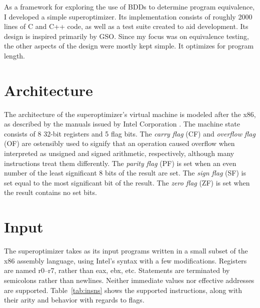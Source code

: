 \documentclass[a4paper,11pt]{kth-mag}
\begin{document}
As a framework for exploring the use of BDDs to determine program equivalence, I developed a simple superoptimizer.
Its implementation consists of roughly 2000 lines of C and C++ code, as well as a test suite created to aid development.
Its design is inspired primarily by GSO.
Since my focus was on equivalence testing, the other aspects of the design were mostly kept simple.
It optimizes for program length.

\section{Architecture}

The architecture of the superoptimizer's virtual machine is modeled after the x86, as described by the manuals issued by Intel Corporation \cite{intel_1,intel_2a,intel_2b}. %
The machine state consists of 8 32-bit registers and 5 flag bits.
The \emph{carry flag} (CF) and \emph{overflow flag} (OF) are ostensibly used to signify that an operation caused overflow when interpreted as unsigned and signed arithmetic, respectively, although many instructions treat them differently.
The \emph{parity flag} (PF) is set when an even number of the least significant 8 bits of the result are set.
The \emph{sign flag} (SF) is set equal to the most significant bit of the result.
The \emph{zero flag} (ZF) is set when the result contains no set bits.

\section{Input}

The superoptimizer takes as its input programs written in a small subset of the x86 assembly language, using Intel's syntax with a few modifications.
Registers are named r0--r7, rather than eax, ebx, etc.
Statements are terminated by semicolons rather than newlines.
Neither immediate values nor effective addresses are supported.
Table~\ref{tab:insns} shows the supported instructions, along with their arity and behavior with regards to flags.
\end{document}
